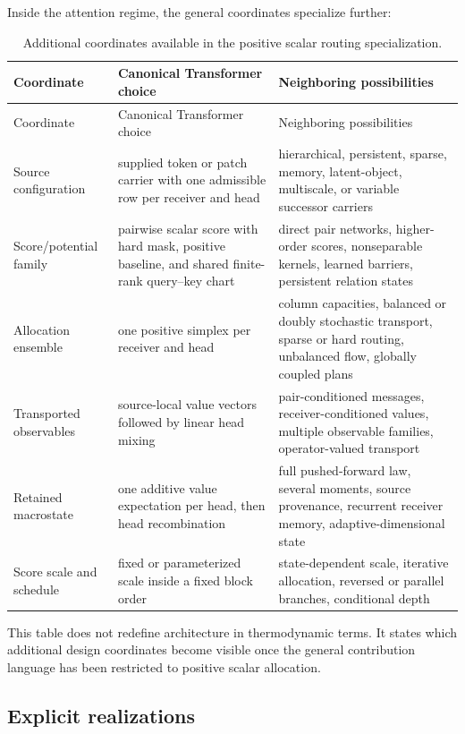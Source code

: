 Inside the attention regime, the general coordinates specialize further:

\begin{longtable}{@{}p{}p{}p{}@{}}
\caption{Additional coordinates available in the positive scalar routing specialization.}\label{tab:positive-coordinates}\\
\toprule
Coordinate & Canonical Transformer choice & Neighboring possibilities \\
\midrule
\endfirsthead
\toprule
Coordinate & Canonical Transformer choice & Neighboring possibilities \\
\midrule
\endhead
Source configuration & supplied token or patch carrier with one admissible row per receiver and head & hierarchical, persistent, sparse, memory, latent-object, multiscale, or variable successor carriers \\
Score/potential family & pairwise scalar score with hard mask, positive baseline, and shared finite-rank query--key chart & direct pair networks, higher-order scores, nonseparable kernels, learned barriers, persistent relation states \\
Allocation ensemble & one positive simplex per receiver and head & column capacities, balanced or doubly stochastic transport, sparse or hard routing, unbalanced flow, globally coupled plans \\
Transported observables & source-local value vectors followed by linear head mixing & pair-conditioned messages, receiver-conditioned values, multiple observable families, operator-valued transport \\
Retained macrostate & one additive value expectation per head, then head recombination & full pushed-forward law, several moments, source provenance, recurrent receiver memory, adaptive-dimensional state \\
Score scale and schedule & fixed or parameterized scale inside a fixed block order & state-dependent scale, iterative allocation, reversed or parallel branches, conditional depth \\
\bottomrule
\end{longtable}

This table does not redefine architecture in thermodynamic terms. It states which additional design coordinates become visible once the general contribution language has been restricted to positive scalar allocation.

\subsection{Explicit realizations}

